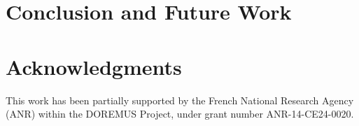 \documentclass[runningheads,a4paper]{llncs}
\begin{document}


\section{Conclusion and Future Work}
\label{sec:conclusion}




\section*{Acknowledgments}
This work has been partially supported by the French National Research Agency (ANR) within the DOREMUS Project, under grant number ANR-14-CE24-0020.



\end{document}
